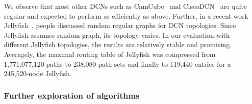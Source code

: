 
 We observe that most other DCNs such as CamCube~\cite{camcube} and CiscoDCN~\cite{ciscodc} are quite regular and expected to perform as efficiently as above. Further, in a recent work Jellyfish~\cite{jellyfish}, people discussed random regular graphs for DCN topologies. Since Jellyfish assumes random graph, its topology varies. In our evaluation with different Jellyfish topologies, the results are relatively stable and promising. Averagely, the maximal routing table of Jellyfish was compressed from 1,771,077,120 paths to 238,080 path sets and finally to 119,440 entries for a 245,520-node Jellyfish.



\subsubsection{Further exploration of \sys algorithms}
%
%
%


